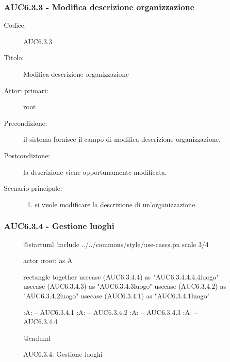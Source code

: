 \documentclass[casi-duso]{subfiles}
\begin{document}
\subsubsection{AUC6.3.3 - Modifica descrizione organizzazione}%
\label{subsub:AUC6.3.3}
\begin{description}
  \item[Codice:] AUC6.3.3
  \item[Titolo:] Modifica descrizione organizzazione
  \item[Attori primari:] root
  \item[Precondizione:] il sistema fornisce il campo di modifica descrizione organizzazione.
  \item[Postcondizione:] la descrizione viene opportunamente modificata.
  \item[Scenario principale:]
  \begin{enumerate}
    \item si vuole modificare la descrizione di un'organizzazione.
  \end{enumerate}
\end{description}

\subsubsection{AUC6.3.4 - Gestione luoghi}%
\label{subsub:AUC6.3.4}

\begin{figure}[h!]
  \centering
  \begin{plantuml}
  @startuml
  !include ../../commons/style/use-cases.pu
  scale 3/4

  actor :root: as A

  rectangle {
    together {
      usecase (AUC6.3.4.4) as "AUC6.3.4.4.4.4\nSeleziona luogo"
      usecase (AUC6.3.4.3) as "AUC6.3.4.3\nModifica luogo"
      usecase (AUC6.3.4.2) as "AUC6.3.4.2\nEliminazione luogo"
      usecase (AUC6.3.4.1) as "AUC6.3.4.1\nAggiungi luogo"
    }
  }

  :A: -- AUC6.3.4.1
  :A: -- AUC6.3.4.2
  :A: -- AUC6.3.4.3
  :A: -- AUC6.3.4.4

  @enduml
  \end{plantuml}
  \caption{AUC6.3.4: Gestione luoghi}
  \label{fig:auc6_3_4}
\end{figure}
\end{document}

